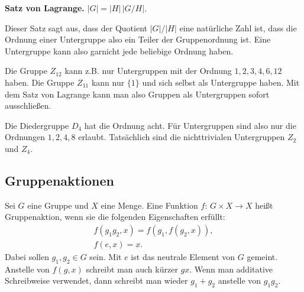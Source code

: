 \documentclass[a4paper,10pt,fleqn,twocolumn,twoside]{article}
\begin{document}
\textbf{Satz von Lagrange.} \(|G|=|H|\,|G/H|\).

Dieser Satz sagt aus, dass der Quotient \(|G|/|H|\) eine natürliche Zahl ist, dass die Ordnung einer Untergruppe also ein Teiler der Gruppenordnung ist. Eine Untergruppe kann also garnicht jede beliebige Ordnung haben.

Die Gruppe \(Z_{12}\) kann z.B. nur Untergruppen mit der Ordnung \(1,2,3,4,6,12\) haben. Die Gruppe \(Z_{11}\) kann nur \(\{1\}\) und sich selbst als Untergruppe haben. Mit dem Satz von Lagrange kann man also Gruppen als Untergruppen sofort ausschließen.

Die Diedergruppe \(D_4\) hat die Ordnung acht. Für Untergruppen sind also nur die Ordnungen \(1,2,4,8\) erlaubt. Tatsächlich sind die nichttrivialen Untergruppen \(Z_2\) und \(Z_4\).

\subsection{Gruppenaktionen}

Sei \(G\) eine Gruppe und \(X\) eine Menge. Eine Funktion \(f{:}\,G\times X\rightarrow X\) heißt Gruppenaktion, wenn sie die folgenden Eigenschaften erfüllt:
\begin{gather*}
f(g_1g_2,x) = f(g_1,f(g_2,x)),\\
f(e,x) = x.
\end{gather*}
Dabei sollen \(g_1,g_2\in G\) sein. Mit \(e\) ist das neutrale Element von \(G\) gemeint. Anstelle von \(f(g,x)\) schreibt man auch kürzer \(gx\). Wenn man additative Schreibweise verwendet, dann schreibt man wieder \(g_1+g_2\) anstelle von \(g_1g_2\).
\end{document}
